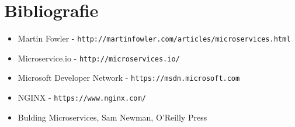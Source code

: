 \documentclass[12pt, a4paper, oneside, romanian]{teza-upb}
\begin{document}
\chapter{Bibliografie}

\begin{itemize}
 \item Martin Fowler - \texttt{http://martinfowler.com/articles/microservices.html}
 \item Microservice.io - \texttt{http://microservices.io/}
 \item Microsoft Developer Network - \texttt{https://msdn.microsoft.com}
 \item NGINX - \texttt{https://www.nginx.com/}
 \item Bulding Microservices, Sam Newman, O'Reilly Press
\end{itemize}	
\end{document}
